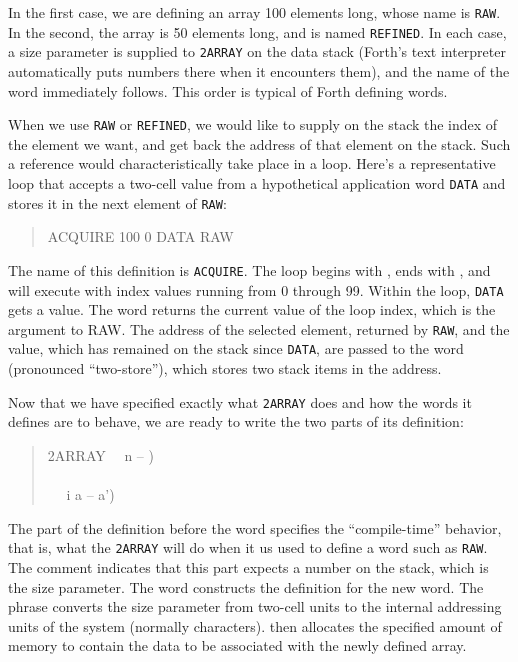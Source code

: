 In the first case, we are defining an array 100 elements long, whose
name is \texttt{RAW}. In the second, the array is 50 elements long,
and is named \texttt{REFINED}. In each case, a size parameter is
supplied to \texttt{2ARRAY} on the data stack (Forth's text
interpreter automatically puts numbers there when it encounters
them), and the name of the word immediately follows. This order is
typical of Forth defining words.

When we use \texttt{RAW} or \texttt{REFINED}, we would like to
supply on the stack the index of the element we want, and get back
the address of that element on the stack. Such a reference would
characteristically take place in a loop. Here's a representative
loop that accepts a two-cell value from a hypothetical application
word \texttt{DATA} and stores it in the next element of \texttt{RAW}:

\begin{quote}\ttfamily
	\word{:} ACQUIRE
		100 0 
			DATA  RAW 
	\word{;}
\end{quote}

The name of this definition is \texttt{ACQUIRE}. The loop begins with
, ends with , and will execute with index values
running from 0 through 99. Within the loop, \texttt{DATA} gets a value.
The word  returns the current value of the loop index, which
is the argument to RAW. The address of the selected element, returned
by \texttt{RAW}, and the value, which has remained on the stack since
\texttt{DATA}, are passed to the word  (pronounced
``two-store''), which stores two stack items in the address.

Now that we have specified exactly what \texttt{2ARRAY} does and how
the words it defines are to behave, we are ready to write the two
parts of its definition:

\begin{quote}\ttfamily
	\word{:} 2ARRAY~~ n -- ) \\
	\tab {} ~    \\
	\tab {} ~~  i a -- a') ~
		 ~   \word{+} ~
	\word{;}
\end{quote}

The part of the definition before the word  specifies the
``compile-time'' behavior, that is, what the \texttt{2ARRAY} will do
when it us used to define a word such as \texttt{RAW}. The comment
indicates that this part expects a number on the stack, which is the
size parameter. The word  constructs the definition for
the new word. The phrase   converts the size
parameter from two-cell units to the internal addressing units of the
system (normally characters).  then allocates the specified
amount of memory to contain the data to be associated with the newly
defined array.

